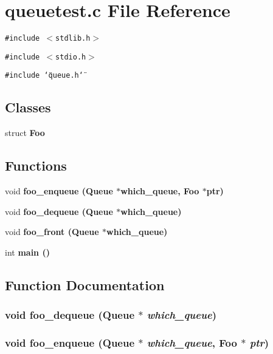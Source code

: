 \section{queuetest.c File Reference}
\label{queuetest_8c}
{\tt \#include $<$stdlib.h$>$}\par
{\tt \#include $<$stdio.h$>$}\par
{\tt \#include \char`\"{}queue.h\char`\"{}}\par
\subsection*{Classes}
\begin{CompactItemize}
\item 
struct \bf{Foo}
\end{CompactItemize}
\subsection*{Functions}
\begin{CompactItemize}
\item 
void \bf{foo\_\-enqueue} (\bf{Queue} $\ast$which\_\-queue, \bf{Foo} $\ast$ptr)
\item 
void \bf{foo\_\-dequeue} (\bf{Queue} $\ast$which\_\-queue)
\item 
void \bf{foo\_\-front} (\bf{Queue} $\ast$which\_\-queue)
\item 
int \bf{main} ()
\end{CompactItemize}


\subsection{Function Documentation}
\subsubsection{\setlength{\rightskip}{0pt plus 5cm}void foo\_\-dequeue (\bf{Queue} $\ast$ {\em which\_\-queue})}\label{queuetest_8c_3e6648cf6e57dbf0fee650a23a851171}


\subsubsection{\setlength{\rightskip}{0pt plus 5cm}void foo\_\-enqueue (\bf{Queue} $\ast$ {\em which\_\-queue}, \bf{Foo} $\ast$ {\em ptr})}\label{queuetest_8c_ea6420bcd79b5551c1e0d53a0fb157d4}



